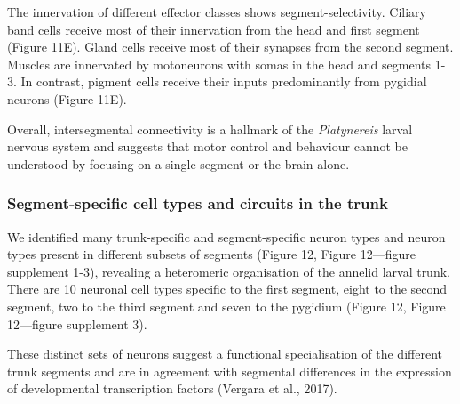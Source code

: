 \documentclass[
  11pt,
]{article}
\begin{document}
The innervation of different effector classes shows segment-selectivity.
Ciliary band cells receive most of their innervation from the head and
first segment (Figure 11E). Gland cells receive most of their synapses
from the second segment. Muscles are innervated by motoneurons with
somas in the head and segments 1-3. In contrast, pigment cells receive
their inputs predominantly from pygidial neurons (Figure 11E).

Overall, intersegmental connectivity is a hallmark of the
\emph{Platynereis} larval nervous system and suggests that motor control
and behaviour cannot be understood by focusing on a single segment or
the brain alone.

\subsubsection{Segment-specific cell types and circuits in the
trunk}\label{segment-specific-cell-types-and-circuits-in-the-trunk}

We identified many trunk-specific and segment-specific neuron types and
neuron types present in different subsets of segments (Figure 12, Figure
12---figure supplement 1-3), revealing a heteromeric organisation of the
annelid larval trunk. There are 10 neuronal cell types specific to the
first segment, eight to the second segment, two to the third segment and
seven to the pygidium (Figure 12, Figure 12---figure supplement 3).

These distinct sets of neurons suggest a functional specialisation of
the different trunk segments and are in agreement with segmental
differences in the expression of developmental transcription factors
(Vergara et al., 2017).
\end{document}
